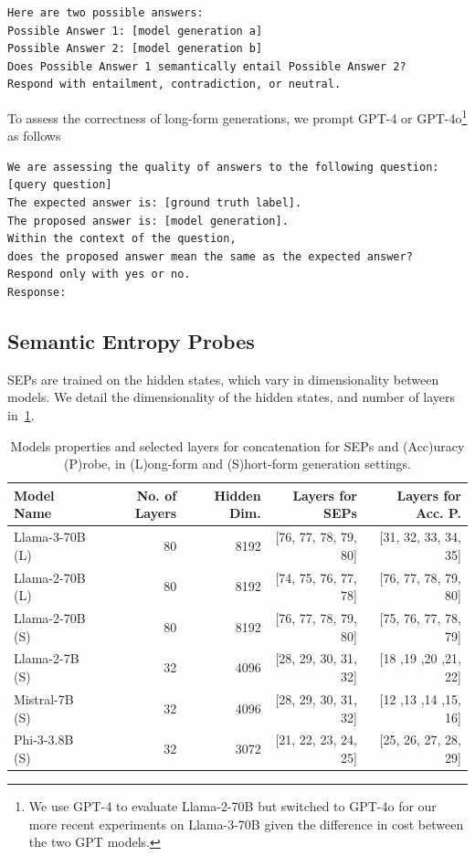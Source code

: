 \documentclass{article}
\begin{document}
\begin{verbatim}
Here are two possible answers:
Possible Answer 1: [model generation a]
Possible Answer 2: [model generation b]
Does Possible Answer 1 semantically entail Possible Answer 2?
Respond with entailment, contradiction, or neutral.
\end{verbatim}

To assess the correctness of long-form generations, we prompt GPT-4 \citep{openai2023gpt4} or GPT-4o\footnote{
We use GPT-4 to evaluate Llama-2-70B but switched to GPT-4o for our more recent experiments on Llama-3-70B given the difference in cost between the two GPT models.
}
as follows
\begin{verbatim}
We are assessing the quality of answers to the following question: [query question]
The expected answer is: [ground truth label].
The proposed answer is: [model generation].
Within the context of the question,
does the proposed answer mean the same as the expected answer?
Respond only with yes or no.
Response:
\end{verbatim}


\subsection{Semantic Entropy Probes}\label{app:sep}
SEPs are trained on the hidden states, which vary in dimensionality between models.
We detail the dimensionality of the hidden states, and number of layers in~\cref{tab:model_dimensions}. 



\begin{table}[ht]
    \centering
    \caption{Models properties and selected layers for concatenation for SEPs and (Acc)uracy (P)robe, in (L)ong-form and (S)hort-form generation settings.}
    \vspace{0.5em}
    \label{tab:model_dimensions}
    \begin{tabular}{lrrrr}
        \toprule
        \textbf{Model Name} & \textbf{No. of Layers} & \textbf{Hidden Dim.} & \textbf{Layers for SEPs} & \textbf{Layers for Acc. P.} \\
        \midrule
        Llama-3-70B (L) & 80 & 8192 & [76, 77, 78, 79, 80] & [31, 32, 33, 34, 35] \\
        Llama-2-70B (L) & 80 & 8192 & [74, 75, 76, 77, 78] & [76, 77, 78, 79, 80] \\
        Llama-2-70B (S) & 80 & 8192 & [76, 77, 78, 79, 80] & [75, 76, 77, 78, 79] \\
        Llama-2-7B (S) & 32 & 4096 & [28, 29, 30, 31, 32] & [18 ,19 ,20 ,21, 22] \\
        Mistral-7B (S) & 32 & 4096 & [28, 29, 30, 31, 32] & [12 ,13 ,14 ,15, 16] \\
        Phi-3-3.8B (S) & 32 & 3072 & [21, 22, 23, 24, 25] & [25, 26, 27, 28, 29] \\
        \bottomrule
    \end{tabular}
\end{table}
\end{document}
